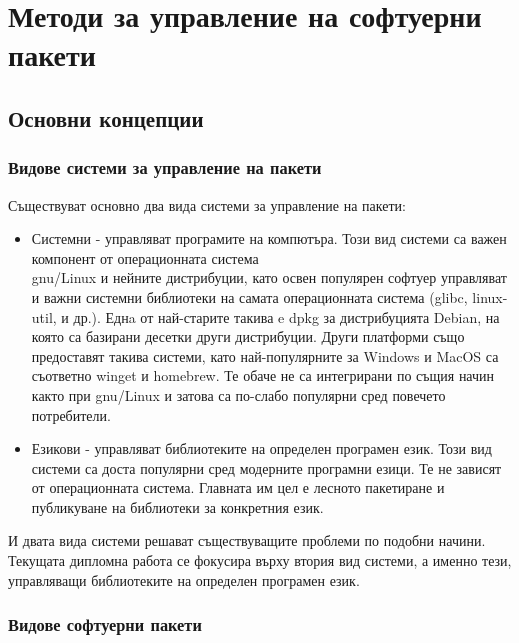 \graphicspath{ {./chapter1/images/} }

\chapter{Методи за управление на софтуерни пакети}


\section{Основни концепции}

\subsection{Видове системи за управление на пакети}

Съществуват основно два вида системи за управление на пакети:

\begin{itemize}
    \item Системни - управляват програмите на компютъра. Този вид системи са
          важен компонент от операционната система \\
          \acrshort{gnu}/Linux и нейните дистрибуции, като освен популярен
          софтуер управляват и важни системни библиотеки на самата операционната
          система (glibc, linux-util, и др.). Еднa от най-старите такива e dpkg
          за дистрибуцията Debian, на която са базирани десетки други
          дистрибуции. Други платформи също предоставят такива системи, като
          най-популярните за Windows и MacOS са съответно winget и homebrew. Те
          обаче не са интегрирани по същия начин както при \acrshort{gnu}/Linux
          и затова са по-слабо популярни сред повечето потребители.
    \item Езикови - управляват библиотеките на определен програмен език. Този
          вид системи са доста популярни сред модерните програмни езици. Те не
          зависят от операционната система. Главната им цел е лесното пакетиране
          и публикуване на библиотеки за конкретния език.
\end{itemize}

И двата вида системи решават съществуващите проблеми по подобни начини. Текущата
дипломна работа се фокусира върху втория вид системи, а именно тези, управляващи
библиотеките на определен програмен език.


\subsection{Видове софтуерни пакети}

